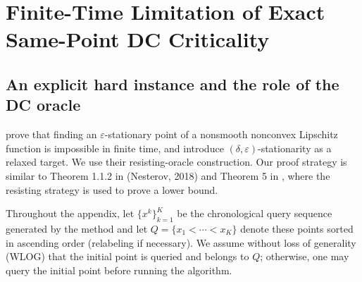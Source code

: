 \section{Finite-Time Limitation of Exact Same-Point DC Criticality}
\label{Appendix: Finite-Time Barriers of DC}

\subsection{An explicit hard instance and the role of the DC oracle}
\label{subsec:explicit-dc-instance}

\citep{Zhang-2020-Complexity} prove that finding an \(\varepsilon\)-stationary point of a nonsmooth nonconvex Lipschitz function is impossible in finite time, and introduce \((\delta,\varepsilon)\)-stationarity as a relaxed target. We use their resisting-oracle construction. Our proof strategy is similar to Theorem 1.1.2 in (Nesterov, 2018) and Theorem 5 in \cite{Zhang-2020-Complexity}, where the resisting strategy is used to prove a lower bound.


Throughout the appendix, let \(\{x^k\}_{k=1}^K\) be the chronological query sequence generated by the method and let
\(Q=\{x_1<\cdots<x_K\}\) denote these points sorted in ascending order (relabeling if necessary). We assume without loss of
generality (WLOG) that the initial point is queried and belongs to $Q$;
otherwise, one may query the initial point before running the algorithm.

